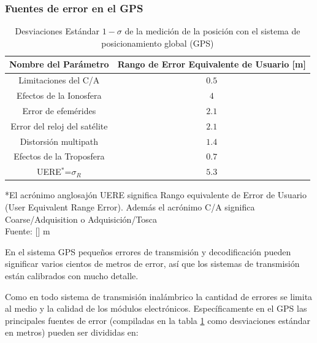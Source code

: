 \documentclass[10pt]{report}
\numberwithin{equation}{chapter}
\numberwithin{algorithm}{chapter}
\newcommand{\bcite}[1]{[\cite{#1}]}
\begin{document}
\subsubsection{Fuentes de error en el GPS}
\begin{table}
\begin{center}
\caption{Desviaciones Estándar $1-\sigma$ de la medición de la posición con el sistema de posicionamiento global (GPS) }

\begin{tabular}{c|c} \hline
\textbf{Nombre del Parámetro}&\textbf{Rango de Error Equivalente de Usuario [m]}\\ \hline
Limitaciones del C/A &$0.5$\\ 
Efectos de la Ionosfera& $4$\\ 
Error de efemérides& $2.1$\\
Error del reloj del satélite& $2.1$\\
Distorsión multipath& $1.4$\\
Efectos de la Troposfera& $0.7$\\ \hline
UERE${}^*$=$\sigma_R$& $5.3$\\ \hline
\end{tabular}
\label{fundamentosGPS_tb3}

\end{center}
\scriptsize{*El acrónimo anglosajón UERE significa Rango equivalente de Error de Usuario (User Equivalent Range Error). Además el acrónimo C/A significa Coarse/Adquisition o Adquisición/Tosca\\
Fuente: \bcite{Bradford2001}}
m\end{table}
En el sistema GPS pequeños errores de transmisión y decodificación pueden significar varios cientos de metros de error, así que los sistemas de transmisión están calibrados con mucho detalle.\par
Como en todo sistema de transmisión inalámbrico la cantidad de errores se limita al medio y la calidad de los módulos electrónicos. Específicamente en el GPS las principales fuentes de error (compiladas en la tabla \ref{fundamentosGPS_tb3} como desviaciones estándar en metros) pueden ser divididas en:
\end{document}
